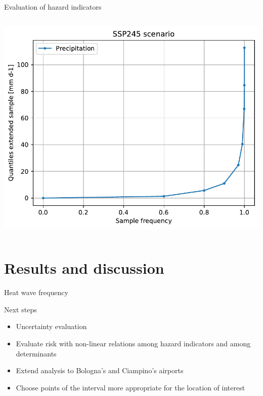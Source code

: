\documentclass[aspectratio=169]{beamer}
\begin{document}
\begin{frame}{Evaluation of hazard indicators}
\begin{columns}[c]
\begin{column}{0.40\textwidth}
{\begin{center}
    \includegraphics[width=0.47\textheight]{precipitation_quantile_ssp245_sample}
  \end{center}
  }
\end{column}
\end{columns}
\end{frame}


\section{Results and discussion}
\begin{frame}{Heat wave frequency}
\end{frame}


\begin{frame}{Next steps}
  \begin{itemize}
    \item Uncertainty evaluation
    \item Evaluate risk with non-linear relations among hazard indicators and among determinants
    \item Extend analysis to Bologna's and Ciampino's airports
    \item Choose points of the interval more appropriate for the location of interest
  \end{itemize}
\end{frame}
\end{document}

